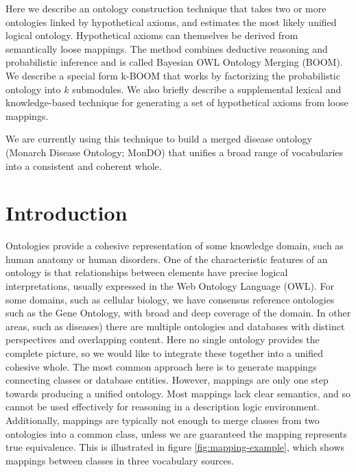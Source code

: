 \documentclass{my}
\begin{document}
Here we describe an ontology construction technique that takes
two or more ontologies linked by hypothetical axioms, and estimates
the most likely unified logical ontology. Hypothetical axioms can
themselves be derived from semantically loose mappings. The method
combines deductive reasoning and probabilistic inference and is called
Bayesian OWL Ontology Merging (BOOM). We describe a special form
k-BOOM that works by factorizing the probabilistic ontology into $k$
submodules. We also briefly describe a supplemental lexical and
knowledge-based technique for generating a set of hypothetical axioms
from loose mappings.

We are currently using this technique to build a merged disease
ontology (Monarch Disease Ontology; MonDO) that unifies a broad range
of vocabularies into a consistent and coherent whole.


\section{Introduction}

Ontologies provide a cohesive representation of some knowledge domain,
such as human anatomy or human disorders. One of the
characteristic features of an ontology is that relationships between
elements have precise logical interpretations, usually expressed in the Web
Ontology Language (OWL). For some domains, such as cellular biology,
we have consensus reference ontologies such as the Gene Ontology, with
broad and deep coverage of the domain. In other areas, such as
diseases) there are multiple ontologies and databases with distinct
perspectives and overlapping content. Here no single ontology provides
the complete picture, so we would like to integrate these together into a
unified cohesive whole. The most common approach here is to generate
mappings connecting classes or database entities. However, mappings
are only one step towards producing a unified ontology. Most mappings
lack clear semantics, and so cannot be used effectively for reasoning
in a description logic environment. Additionally, mappings are
typically not enough to merge classes from two ontologies into a
common class, unless we are guaranteed the mapping represents true
equivalence. This is illustrated in figure \ref{fig:mapping-example},
which shows mappings between classes in three vocabulary
sources.
\end{document}
